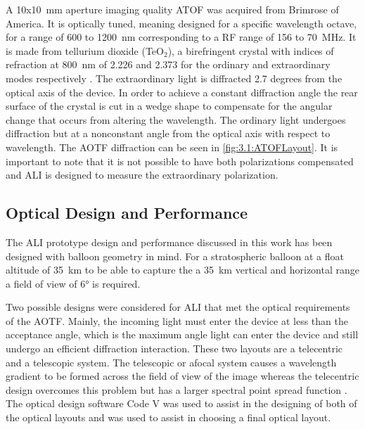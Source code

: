 \documentclass[12pt]{article}
\begin{document}
A 10x10~mm aperture imaging quality ATOF was acquired from Brimrose of America. It is optically tuned, meaning designed for a specific wavelength octave, for a range of 600 to 1200~nm corresponding to a RF range of 156 to 70~MHz. It is made from tellurium dioxide (TeO$_{2}$), a birefringent crystal with indices of refraction at 800~nm of 2.226 and 2.373 for the ordinary and extraordinary modes respectively \citep{Uchida1971}. The extraordinary light is diffracted 2.7 degrees from the optical axis of the device. In order to achieve a constant diffraction angle the rear surface of the crystal is cut in a wedge shape to compensate for the angular change that occurs from altering the wavelength. The ordinary light undergoes diffraction but at a nonconstant angle from the optical axis with respect to wavelength. The AOTF diffraction can be seen in \autoref{fig:3.1:ATOFLayout}. It is important to note that it is not possible to have both polarizations compensated and ALI is designed to measure the extraordinary polarization.

\subsection{Optical Design and Performance}

The ALI prototype design and performance discussed in this work has been designed with balloon geometry in mind. For a stratospheric balloon at a float altitude of 35~km to be able to capture the a 35~km vertical and horizontal range a field of view of 6\si{\degree} is required.


Two possible designs were considered for ALI that met the optical requirements of the AOTF. Mainly, the incoming light must enter the device at less than the acceptance angle, which is the maximum angle light can enter the device and still undergo an efficient diffraction interaction. These two layouts are a telecentric and a telescopic system. The telescopic or afocal system causes a wavelength gradient to be formed across the field of view of the image whereas the telecentric design overcomes this problem but has a larger spectral point spread function \citep{Suhre2004}. The optical design software Code V was used to assist in the designing of both of the optical layouts and was used to assist in choosing a final optical layout.
\end{document}
